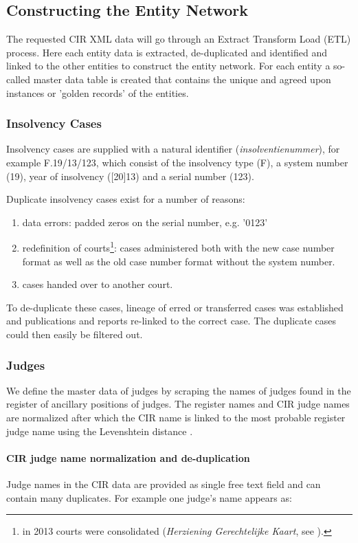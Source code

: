 \subsection{Constructing the Entity Network}
The requested CIR XML data will go through an Extract Transform Load (ETL) process. Here each entity data is extracted, de-duplicated and identified and linked to the other entities to construct the entity network. For each entity a so-called master data table is created that contains the unique and agreed upon instances or 'golden records' of the entities. 

\subsubsection{Insolvency Cases}
Insolvency cases are supplied with a natural identifier (\textit{insolventienummer}), for example F.19/13/123, which consist of the insolvency type (F), a system number (19), year of insolvency ([20]13) and a serial number (123). 

Duplicate insolvency cases exist for a number of reasons:
\begin{enumerate}
	\item data errors: padded zeros on the serial number, e.g. '0123'
	\item redefinition of courts\footnote{in 2013 courts were consolidated (\textit{Herziening Gerechtelijke Kaart}, see \cite{om:1}).}: cases administered both with the new case number format as well as the old case number format without the system number.
	\item cases handed over to another court.
\end{enumerate}
To de-duplicate these cases, lineage of erred or transferred cases was established and publications and reports re-linked to the correct case. The duplicate cases could then easily be filtered out.

\subsubsection{Judges}
We define the master data of judges by scraping the names of judges found in the register of ancillary positions of judges\cite{rechtspraak:nevenfuncties}. The register names and CIR judge names are normalized after which the CIR name is linked to the most probable register judge name using the Levenshtein distance .

\paragraph{CIR judge name normalization and de-duplication}
Judge names in the CIR data are provided as single free text field and can contain many duplicates. For example one judge's name appears as:

